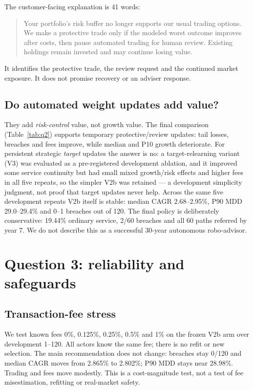 \documentclass[11pt,a4paper]{article}
\begin{document}
The customer-facing explanation is 41 words:
\begin{quote}
Your portfolio's risk buffer no longer supports our usual trading options. We make
a protective trade only if the modeled worst outcome improves after costs, then
pause automated trading for human review. Existing holdings remain invested and
may continue losing value.
\end{quote}
It identifies the protective trade, the review request and the continued market
exposure. It does not promise recovery or an adviser response.

\subsection{Do automated weight updates add value?}
\label{sec:value}
They add \emph{risk-control} value, not growth value. The final comparison
(Table~\ref{tab:q2}) supports temporary protective/review updates: tail losses,
breaches and fees improve, while median and P10 growth deteriorate. For
persistent strategic \emph{target} updates the answer is no: a target-relearning
variant (V3) was evaluated as a pre-registered development ablation, and it
improved some service continuity but had small mixed growth/risk effects and
higher fees in all five repeats, so the simpler V2b was retained --- a
development simplicity judgment, not proof that target updates never help.
Across the same five development repeats V2b itself is stable: median CAGR
2.68--2.95\%, P90 MDD 29.0--29.4\% and 0--1 breaches out of 120. The final
policy is deliberately conservative: 19.44\% ordinary service, 2/60 breaches
and all 60 paths referred by year 7. We do not describe this as a successful
30-year autonomous robo-advisor.

\section{Question 3: reliability and safeguards}
\label{sec:q3}

\subsection{Transaction-fee stress}
We test known fees 0\%, 0.125\%, 0.25\%, 0.5\% and 1\% on the frozen V2b arm
over development 1--120. All actors know the same fee; there is no refit or new
selection. The main recommendation does not change: breaches stay 0/120 and
median CAGR moves from 2.865\% to 2.802\%; P90 MDD stays near 28.98\%. Trading
and fees move modestly. This is a cost-magnitude test, not a test of fee
misestimation, refitting or real-market safety.
\end{document}
